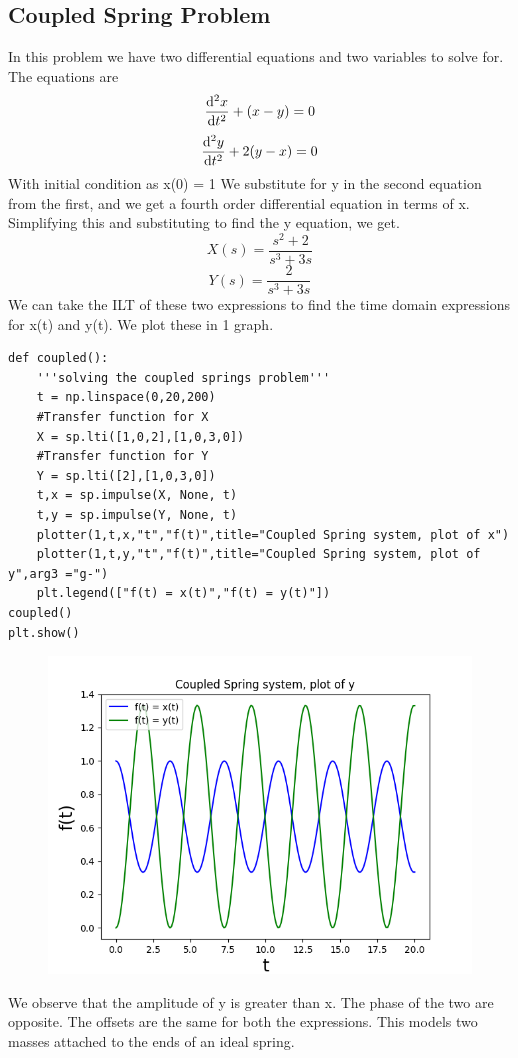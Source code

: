 \documentclass[11pt, a4paper]{article}
\begin{document}
\subsection{Coupled Spring Problem}
{
In this problem we have two differential equations and two variables to solve for.
The equations are
\[\dv[2]{x}{t} +(x-y) = 0 \]
\[\dv[2]{y}{t} +2(y-x) = 0 \]
With initial condition as x(0) = 1
We substitute for y in the second equation from the first, and we get a fourth order differential equation in terms of x.
Simplifying this and substituting to find the y equation, we get.
\[X(s) = \frac{s^2+2}{s^3+3s} \]
\[Y(s) =  \frac{2}{s^3+3s} \]
We can take the ILT of these two expressions to find the time domain expressions for x(t) and y(t).
We plot these in 1 graph.
}
\begin{verbatim}
def coupled():
    '''solving the coupled springs problem'''
    t = np.linspace(0,20,200)
    #Transfer function for X
    X = sp.lti([1,0,2],[1,0,3,0])
    #Transfer function for Y
    Y = sp.lti([2],[1,0,3,0])
    t,x = sp.impulse(X, None, t)
    t,y = sp.impulse(Y, None, t)
    plotter(1,t,x,"t","f(t)",title="Coupled Spring system, plot of x")
    plotter(1,t,y,"t","f(t)",title="Coupled Spring system, plot of y",arg3 ="g-")
    plt.legend(["f(t) = x(t)","f(t) = y(t)"])
coupled()
plt.show()

\end{verbatim}
\begin{figure}[!tbh]
   	\centering
   	\includegraphics[scale=0.5]{img5.png}
   	\label{fig:32}
   \end{figure}
{ 
We observe that the amplitude of y is greater than x. 
The phase of the two are opposite.
The offsets are the same for both the expressions.
This models two masses attached to the ends of an ideal spring.
}
\end{document}
